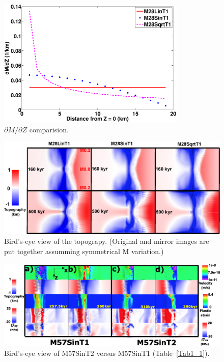 \documentclass[draft,gc]{agutex}
\begin{document}
\begin{figure}[h]
\noindent\includegraphics[width=0.8\textwidth]{./Figures/fig_Results_3_3_1_M_type_plot_dM_dZ.eps}
  \caption{$\partial M/ \partial Z$ comparision.}
 \label{fig_Results_3_3_1_M_type_plot_dM_dZ}
\end{figure}  

\begin{figure}[h]
\noindent\includegraphics[width=1.0\textwidth]{./Figures/fig_Results_3_3_1_hourglass.eps}
  \caption[Bird's-eye view of the topograpy.]{Bird's-eye view of the topograpy. (Original and mirror images are put together assumming symmetrical M variation.) }
 \label{fig_Results_3_3_1_hourglass}
\end{figure} 

\begin{figure}[h]
\noindent\includegraphics[width=1.0\textwidth]{./Figures/fig_Results_Weakening_2_M57SinT1VST2_CutbackVSsecondaryFault.eps}
 \caption{Bird's-eye view of M57SinT2 versus M57SinT1 (Table~\ref{Tab1_1}).}
\label{fig_Results_Weakenging_2}
\end{figure}
\end{document}
